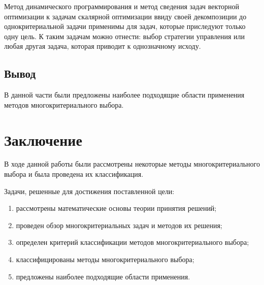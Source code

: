 Метод динамического программирования и метод сведения задач векторной оптимизации к задачам скалярной оптимизации ввиду своей декомпозиции до однокритериальной задачи применимы для задач, которые приследуют только одну цель. К таким задачам можно отнести: выбор стратегии управления или любая другая задача, которая приводит к однозначному исходу. \cite{bib10} \cite{bib17}

\section{Вывод}
В данной части были предложены наиболее подходящие области применения методов многокритериального выбора.

\chapter*{Заключение}

В ходе данной работы были рассмотрены некоторые методы многокритериального выбора и была проведена их классификация.

Задачи, решенные  для достижения поставленной цели:
\begin{enumerate}[label=\arabic*)]
    \item рассмотрены математические основы теории принятия решений;
    \item проведен обзор многокритериальных задач и методов их решения;
    \item определен критерий классификации методов многокритериального выбора;
    \item классифицированы методы многокритериального выбора;
    \item предложены наиболее подходящие области применения.
\end{enumerate}

